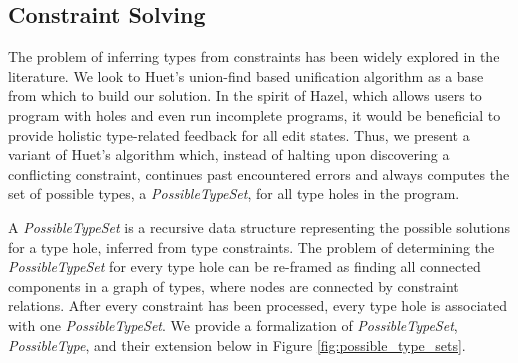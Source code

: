 
\usetikzlibrary{positioning,calc}

\subsection{Constraint Solving}
\label{sec:infalg}
The problem of inferring types from constraints has been widely explored in the literature. We look to Huet's union-find based unification algorithm \cite{G. Huet} as a base from which to build our solution. In the spirit of Hazel, which allows users to program with holes and even run incomplete programs, it would be beneficial to provide holistic type-related feedback for all edit states. Thus, we present a variant of Huet's algorithm which, instead of halting upon discovering a conflicting constraint, continues past encountered errors and always computes the set of possible types, a \textit{PossibleTypeSet}, for all type holes in the program.

A \textit{PossibleTypeSet} is a recursive data structure representing the possible solutions for a type hole, inferred from type constraints. The problem of determining the \textit{PossibleTypeSet} for every type hole can be re-framed as finding all connected components in a graph of types, where nodes are connected by constraint relations. After every constraint has been processed, every type hole is associated with one \textit{PossibleTypeSet}. We provide a formalization of \textit{PossibleTypeSet}, \textit{PossibleType}, and their extension below in Figure \ref{fig:possible_type_sets}.

